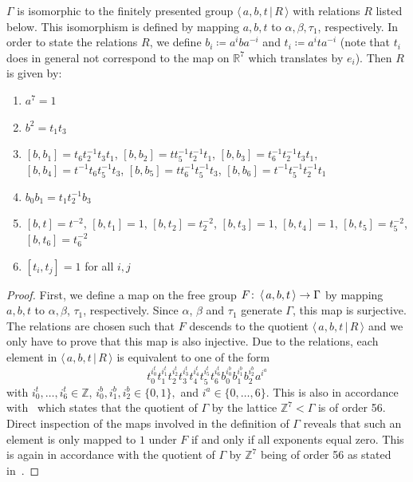 \documentclass[11pt,a4paper]{scrartcl}
\newcommand{\col}{\colon \thinspace}
\numberwithin{equation}{section}
\theoremstyle{plain}
\theoremstyle{definition}
\theoremstyle{remark}
\begin{document}
\begin{proposition}\label{prop:presentation__of_piorb}
$\Gamma$ is isomorphic to the finitely presented group $\langle\, a,b,t \,\vert\, R\, \rangle$ with relations $R$ listed below. This isomorphism is defined by mapping $a,b,t$ to $\alpha,\beta,\tau_1$, respectively. In order to state the relations $R$, we define $b_i \coloneqq a^iba^{-i}$ and $t_i \coloneqq a^i t a^{-i}$ (note that $t_i$ does in general not correspond to the map on $\mathbb{R}^7$ which translates by $e_i$). Then $R$ is given by:
\begin{enumerate}
\item\label{rel:ord7} $a^7=1$
\item\label{rel:b2t}$b^2 = t_1t_3$
\item\label{rel:[b,bi]} $[b,b_{1}] = t_6t_2^{-1}t_3t_1$, $[b,b_{2}] = tt_5^{-1}t_2^{-1}t_1$, $[b,b_{3}] = t_6^{-1}t_2^{-1}t_3t_1$, $[b,b_{4}] = t^{-1}t_6t_5^{-1}t_3$, $[b,b_{5}] = tt_6^{-1}t_5^{-1}t_3$, $[b,b_{6}] = t^{-1}t_5^{-1}t_2^{-1}t_1$
\item\label{rel:b0b1b3} $b_0b_1=t_1t_2^{-1} b_3$
\item\label{rel:[b,ti]} $[b,t]=t^{-2}$, $[b,t_1]=1$, $[b,t_2]=t_2^{-2}$, $[b,t_3]=1$, $[b,t_4]=1$, $[b,t_5]=t_5^{-2}$, $[b,t_6]=t_6^{-2}$
\item\label{rel:[ti,tj]} $[t_i,t_j]=1$ for all $i,j$
\end{enumerate}
\end{proposition}
\begin{proof}
First, we define a map on the free group $F \col \langle \, a,b,t \, \rangle \to \Gamma$ by mapping $a,b,t$ to $\alpha, \beta$, $\tau_1$, respectively. Since $\alpha$, $\beta$ and $\tau_1$ generate $\Gamma$, this map is surjective. The relations are chosen such that $F$ descends to the quotient $\langle \, a,b,t \,\vert\, R\, \rangle$ and we only have to prove that this map is also injective. Due to the relations, each element in $\langle\, a,b,t \,\vert\, R\, \rangle$ is equivalent to one of the form \[t_0^{i^t_0}t_1^{i^t_1}t_2^{i^t_2}t_3^{i^t_3}t_4^{i^t_4}t_5^{i^t_5}t_6^{i^t_6}b_0^{i^b_0}b_1^{i^b_1}b_2^{i^b_2}a^{i^a} \] with $i^t_0,\dots,i^t_6 \in \mathbb{Z}$, $i^b_0,i^b_1,i^b_2 \in \{0,1\},$ and $i^a \in \{0,\dots,6\}$. This is also in accordance with~\cite[Example~18]{Joyce-GeneralisedKummer2} which states that the quotient of $\Gamma$ by the lattice $\mathbb{Z}^7<\Gamma$ is of order 56. Direct inspection of the maps involved in the definition of $\Gamma$ reveals that such an element is only mapped to $1$ under $F$ if and only if all exponents equal zero. This is again in accordance with the quotient of $\Gamma$ by $\mathbb{Z}^7$ being of order 56 as stated in~\cite[Example~18]{Joyce-GeneralisedKummer2}.
\end{proof}
\end{document}
